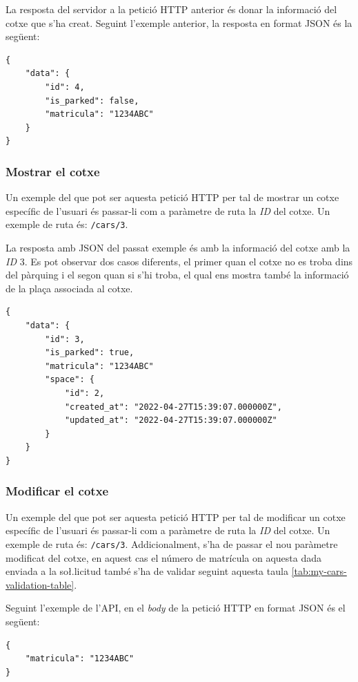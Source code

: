 La resposta del servidor a la petició HTTP anterior és donar la informació del cotxe que s'ha creat.
Seguint l'exemple anterior, la resposta en format JSON és la següent:
\begin{verbatim}
{
    "data": {
        "id": 4,
        "is_parked": false,
        "matricula": "1234ABC"
    }
}
\end{verbatim}

\subsubsection{Mostrar el cotxe}
\label{sssec:mostrar_cotxe}

Un exemple del que pot ser aquesta petició HTTP per tal de mostrar un cotxe específic de l'usuari
és passar-li com a paràmetre de ruta la \emph{ID} del cotxe. Un exemple de ruta és: \texttt{/cars/3}.

La resposta amb JSON del passat exemple és amb la informació del cotxe
amb la \emph{ID} 3. Es pot observar dos casos diferents, el primer quan el cotxe no es troba dins del pàrquing
i el segon quan si s'hi troba, el qual ens mostra també la informació de la plaça associada al cotxe.

\begin{verbatim}
{
    "data": {
        "id": 3,
        "is_parked": true,
        "matricula": "1234ABC"
        "space": {
            "id": 2,
            "created_at": "2022-04-27T15:39:07.000000Z",
            "updated_at": "2022-04-27T15:39:07.000000Z"
        }
    }
}
\end{verbatim}

\subsubsection{Modificar el cotxe}
\label{sssec:modificar_cotxe}

Un exemple del que pot ser aquesta petició HTTP per tal de modificar un cotxe específic de l'usuari
és passar-li com a paràmetre de ruta la \emph{ID} del cotxe. Un exemple de ruta és: \texttt{/cars/3}.
Addicionalment, s'ha de passar el nou paràmetre modificat del cotxe, en aquest cas el número de
matrícula on aquesta dada enviada a la so\l.licitud també s'ha de validar seguint aquesta taula
\autoref{tab:my-cars-validation-table}.

Seguint l'exemple de l'API, en el \emph{body} de la petició HTTP en format JSON és el següent:
\begin{verbatim}
{
    "matricula": "1234ABC"
}
\end{verbatim}

